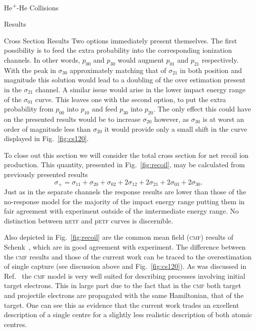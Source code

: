 \documentclass[letterpaper, 11 pt]{report}
\begin{document}
\begin{chapter}{\texorpdfstring{He\textsuperscript{+}}{He+}-He Collisions \label{chap:hephe}}
\begin{section}{Results \label{sec:hephe-disc}}
\begin{subsection}{Cross Section Results \label{sec:hephe-res}}
         Two options immediately present themselves. The first possibility is to feed the extra
         probability into the corresponding ionization channels. In other words, $p_{00}$ and $p_{30}$
         would augment $p_{01}$ and $p_{21}$ respectively. With the peak in $\sigma_{30}$ approximately
         matching that of $\sigma_{21}$ in both position and magnitude this solution would lead to a
         doubling of the over estimation present in the $\sigma_{21}$ channel. A similar issue would
         arise in the lower impact energy range of the $\sigma_{01}$ curve. This leaves one with the
         second option, to put the extra probability from $p_{00}$ into $p_{10}$ and feed $p_{30}$ into
         $p_{20}$. The only effect this could have on the presented results would be to increase
         $\sigma_{20}$ however, as $\sigma_{30}$ is at worst an order of magnitude less than
         $\sigma_{20}$ it would provide only a small shift in the curve displayed in
         Fig.~\ref{fig:cs120}.

         To close out this section we will consider the total cross section for net recoil ion
         production. This quantity, presented in Fig.~\ref{fig:recoil}, may be calculated from
         previously presented results
         \begin{equation}
            \sigma_{+} = \sigma_{11} + \sigma_{20} + \sigma_{02} + 2 \sigma_{12} + 2 \sigma_{21}
                                     + 2 \sigma_{03} + 2 \sigma_{30}.
         \end{equation}
         Just as in the separate channels the response results are lower than those of the no-response
         model for the majority of the impact energy range putting them in fair agreement with
         experiment outside of the imtermediate energy range. No distinction between n\textsc{etf} and
         p\textsc{etf} curves is discernible.

         Also depicted in Fig.~\ref{fig:recoil} are the common mean field (\textsc{cmf}) results of
         Schenk~\cite{geraldDiss}, which are in good agreement with experiment. The difference between
         the \textsc{cmf} results and those of the current work can be traced to the overestimation of
         single capture (see discussion above and Fig.~\ref{fig:cs120}). As was discussed in
         Ref.~\cite{geraldDiss} the \textsc{cmf} model is very well suited for describing processes
         involving initial target electrons. This in large part due to the fact that in the \textsc{cmf}
         both target and projectile electrons are propagated with the same Hamiltonian, that of the
         target. One can see this as evidence that the current work trades an excellent description of a
         single centre for a slightly less realistic description of both atomic centres.


\end{subsection}
\end{section}
\end{chapter}
\end{document}
